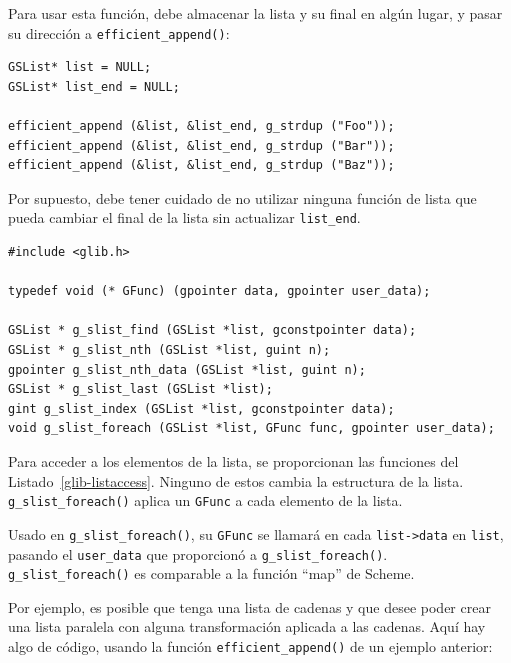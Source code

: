 Para usar esta función, debe almacenar la lista y su final en algún lugar, y pasar su dirección a \lstinline{efficient_append()}:
\begin{lstlisting}
GSList* list = NULL;
GSList* list_end = NULL;

efficient_append (&list, &list_end, g_strdup ("Foo"));
efficient_append (&list, &list_end, g_strdup ("Bar"));
efficient_append (&list, &list_end, g_strdup ("Baz"));
\end{lstlisting}

Por supuesto, debe tener cuidado de no utilizar ninguna función de lista que pueda cambiar el final de la lista sin actualizar \lstinline{list_end}.

\begin{lstlisting}[float, caption={Accessing data in a linked list}, label=glib-listaccess]
#include <glib.h>

typedef void (* GFunc) (gpointer data, gpointer user_data);

GSList * g_slist_find (GSList *list, gconstpointer data);
GSList * g_slist_nth (GSList *list, guint n);
gpointer g_slist_nth_data (GSList *list, guint n);
GSList * g_slist_last (GSList *list);
gint g_slist_index (GSList *list, gconstpointer data);
void g_slist_foreach (GSList *list, GFunc func, gpointer user_data);
\end{lstlisting}

Para acceder a los elementos de la lista, se proporcionan las funciones del Listado~\ref{glib-listaccess}. Ninguno de estos cambia la estructura de la lista. \lstinline{g_slist_foreach()} aplica un \lstinline{GFunc} a cada elemento de la lista.

Usado en \lstinline{g_slist_foreach()}, su \lstinline{GFunc} se llamará en cada \lstinline{list->data} en \lstinline{list}, pasando el \lstinline{user_data} que proporcionó a \lstinline{g_slist_foreach()}. \lstinline{g_slist_foreach()} es comparable a la función ``map'' de Scheme.

Por ejemplo, es posible que tenga una lista de cadenas y que desee poder crear una lista paralela con alguna transformación aplicada a las cadenas. Aquí hay algo de código, usando la función \lstinline{efficient_append()} de un ejemplo anterior:

